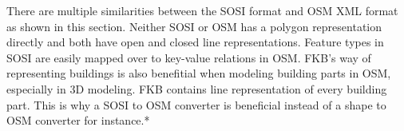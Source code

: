 There are multiple similarities between the SOSI format and OSM XML format as shown in this section. Neither SOSI or OSM has a polygon representation directly and both have open and closed line representations. Feature types in SOSI are easily mapped over to key-value relations in OSM. FKB's way of representing buildings is also benefitial when modeling building parts in OSM, especially in 3D modeling. FKB contains line representation of every building part. This is why a SOSI to OSM converter is beneficial instead of a shape to OSM converter for instance.* %
